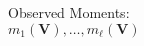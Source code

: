 \documentclass[preview]{standalone}
\begin{document}
\begin{center}
Observed Moments:\\ $m_{1}(\mathbf{V}), \ldots,  m_\ell(\mathbf{V})$
\end{center}
\end{document}
